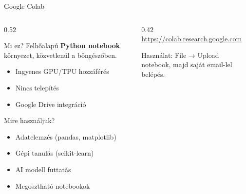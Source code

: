 \documentclass[aspectratio=169, 12pt]{beamer}
\begin{document}
\begin{frame}{Google Colab}
  \footnotesize
  \begin{columns}[T,onlytextwidth]
    \begin{column}{0.52\textwidth}
      \begin{block}{Mi ez?}
        Felhőalapú \textbf{Python notebook} környezet, közvetlenül a böngészőben.
        \begin{itemize}\setlength{\itemsep}{1pt}
          \item Ingyenes GPU/TPU hozzáférés
          \item Nincs telepítés
          \item Google Drive integráció
        \end{itemize}
      \end{block}

      \vspace{0.15cm}

      \begin{exampleblock}{Mire használjuk?}
        \begin{itemize}\setlength{\itemsep}{1pt}
          \item Adatelemzés (pandas, matplotlib)
          \item Gépi tanulás (scikit-learn)
          \item AI modell futtatás
          \item Megosztható notebookok
        \end{itemize}
      \end{exampleblock}
    \end{column}
    \begin{column}{0.42\textwidth}
      \vspace{1cm}
      \centering
      \url{https://colab.research.google.com}

      \vspace{0.5cm}

      Használat: File → Upload notebook, majd saját email-lel belépés.
    \end{column}
  \end{columns}
\end{frame}

\end{document}
